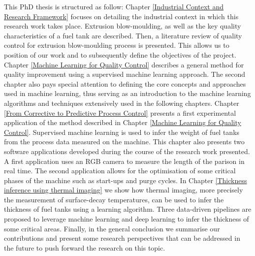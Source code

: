 This PhD thesis is structured as follow: Chapter \ref{Industrial Context and Research Framework} focuses on detailing the industrial context in which this research work takes place. Extrusion blow-moulding, as well as the key quality characteristics of a fuel tank are described. Then, a literature review of quality control for extrusion blow-moulding process is presented. This allows us to position of our work and to subsequently define the objectives of the project. Chapter \ref{Machine Learning for Quality Control} describes a general method  for quality improvement using a supervised machine learning approach. The second chapter also pays special attention to defining the core concepts and approaches used in machine learning, thus serving as an introduction to the machine learning algorithms and techniques extensively used in the following chapters. Chapter \ref{From Corrective to Predictive Process Control} presents a first experimental application of the method described in Chapter \ref{Machine Learning for Quality Control}. Supervised machine learning is used to infer the weight of fuel tanks from the process data measured on the machine. This chapter also presents two software applications developed during the course of the research work presented. A first application uses an RGB camera to measure the length of the parison in real time. The second application allows for the optimisation of some critical phases of the machine such as start-ups and purge cycles. In Chapter \ref{Thickness inference using thermal imaging} we show how thermal imaging, more precisely the measurement of surface-decay temperatures, can be used to infer the thickness of fuel tanks using a learning algorithm. Three data-driven pipelines are proposed to leverage machine learning and deep learning to infer the thickness of some critical areas. Finally, in the general conclusion we summarise our contributions and present some research perspectives that can be addressed in the future to push forward the research on this topic.  

\cleardoublepage